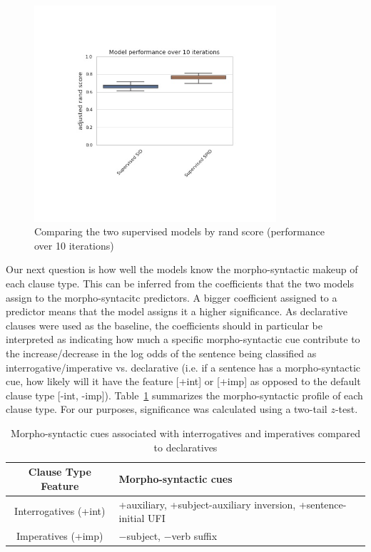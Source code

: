 \begin{figure}[H]
    \centering
    \includegraphics[width=0.8\textwidth]{figures/super-compare-rand-name.jpg}
    \caption{Comparing the two supervised models by rand score (performance over 10 iterations)}
    \label{fig:super-compare-rand}
\end{figure}



Our next question is how well the models know the morpho-syntactic makeup of each clause type. This can be inferred from the coefficients that the two models assign to the morpho-syntacitc predictors. A bigger coefficient assigned to a predictor means that the model assigns it a higher significance. As declarative clauses were used as the baseline, the coefficients should in particular be interpreted as indicating how much a specific morpho-syntactic cue contribute to the increase/decrease in the log odds of the sentence being classified as interrogative/imperative vs. declarative (i.e. if a sentence has a morpho-syntactic cue, how likely will it have the feature [+int] or [+imp] as opposed to the default clause type [-int, -imp]). Table~\ref{tab:engcl:corpus:formal} summarizes the morpho-syntactic profile of each clause type. For our purposes, significance was calculated using a two-tail $z$-test. %

\begin{table}[H]
\begin{center}
\begin{tabular}{c|p{10cm}}
\hline
Clause Type Feature & Morpho-syntactic cues\\
\hline \hline
Interrogatives (+int) & +auxiliary, +subject-auxiliary inversion, +sentence-initial UFI\\
\hline
Imperatives (+imp) & $-$subject, $-$verb suffix\\
\hline \hline
\end{tabular}
\end{center}
\caption{Morpho-syntactic cues associated with interrogatives and imperatives compared to declaratives}
\label{tab:engcl:corpus:formal}
\end{table}%


